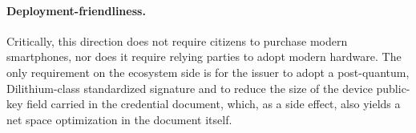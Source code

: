 \documentclass{article}
\begin{document}
\paragraph{Deployment-friendliness.} Critically, this direction does not require citizens to purchase modern smartphones, nor does it require relying parties to adopt modern hardware. The only requirement on the ecosystem side is for the issuer to adopt a post-quantum, Dilithium-class standardized signature and to reduce the size of the device public-key field carried in the credential document, which, as a side effect, also yields a net space optimization in the document itself.



\end{document}
